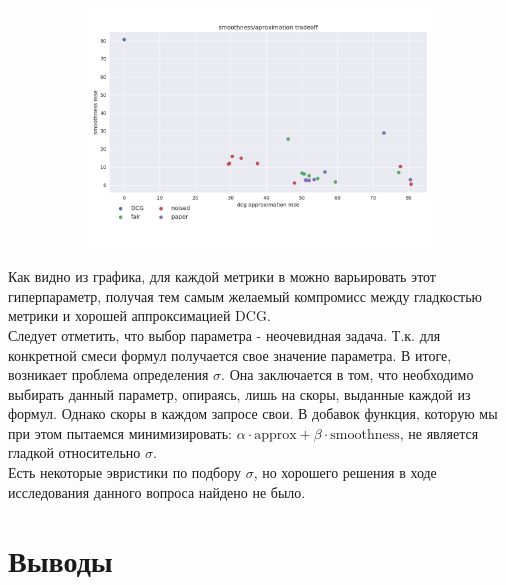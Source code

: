 \documentclass[14pt,a4paper]{amsart}
\theoremstyle{definition}
\theoremstyle{definition}
\renewcommand\i{\textit}
\renewcommand\t{\text}
\begin{document}
\begin{figure}[!h]
    \centering
    \begin{subfigure}{\textwidth}
    \centering
        \includegraphics[width=\textwidth]{tradeoff_max_min}
     \end{subfigure}
\end{figure}

Как видно из графика, для каждой метрики в можно варьировать этот гиперпараметр, получая тем самым желаемый компромисс между гладкостью метрики и хорошей аппроксимацией DCG. \\

Следует отметить, что выбор параметра - неочевидная задача. Т.к. для конкретной смеси формул получается свое значение параметра. В итоге, возникает проблема определения $\sigma$. Она заключается в том, что необходимо выбирать данный параметр, опираясь, лишь на скоры, выданные каждой из формул. Однако скоры в каждом запросе свои. В добавок функция, которую мы при этом пытаемся минимизировать: 
\i{$\alpha \cdot \t{approx} + \beta \cdot \t{smoothness}$}, не является гладкой  относительно $\sigma$. \\

Есть некоторые эвристики по подбору $\sigma$, но хорошего решения в ходе исследования данного вопроса найдено не было.


\newpage
\section{Выводы}
\end{document}
